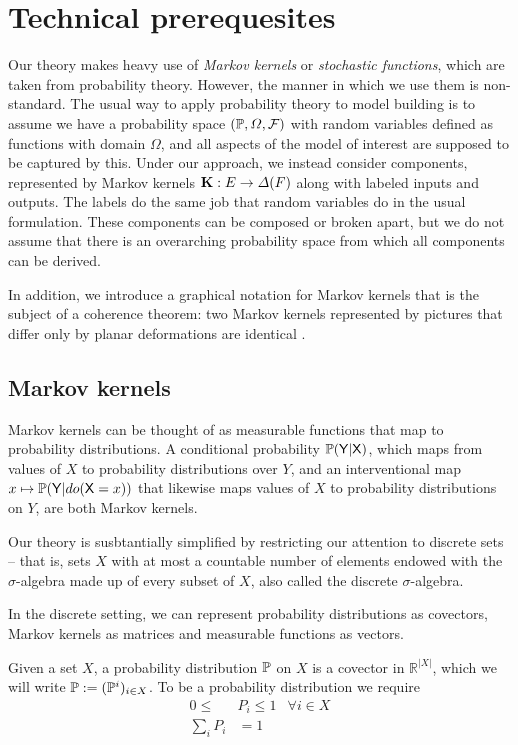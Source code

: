 

\section{Technical prerequesites}

Our theory makes heavy use of \emph{Markov kernels} or \emph{stochastic functions}, which are taken from probability theory. However, the manner in which we use them is non-standard. The usual way to apply probability theory to model building is to assume we have a probability space $(\mathbb{P},\Omega,\mathcal{F})$ with random variables defined as functions with domain $\Omega$, and all aspects of the model of interest are supposed to be captured by this. Under our approach, we instead consider components, represented by Markov kernels $\mathbf{K}:E\to \Delta(F)$ along with labeled inputs and outputs.  The labels do the same job that random variables do in the usual formulation. These components can be composed or broken apart, but we do not assume that there is an overarching probability space from which all components can be derived.

In addition, we introduce a graphical notation for Markov kernels that is the subject of a coherence theorem: two Markov kernels represented by pictures that differ only by planar deformations are identical \citep{selinger_survey_2010}.

\subsection{Markov kernels}
Markov kernels can be thought of as measurable functions that map to probability distributions. A conditional probability $\mathbb{P}(\mathsf{Y}|\mathsf{X})$, which maps from values of $X$ to probability distributions over $Y$, and an interventional map $x\mapsto \mathbb{P}(\mathsf{Y}|do(\mathsf{X}=x))$ that likewise maps values of $X$ to probability distributions on $Y$, are both Markov kernels.

Our theory is susbtantially simplified by restricting our attention to discrete sets -- that is, sets $X$ with at most a countable number of elements endowed with the $\sigma$-algebra made up of every subset of $X$, also called the discrete $\sigma$-algebra.

In the discrete setting, we can represent probability distributions as covectors, Markov kernels as matrices and measurable functions as vectors.

Given a set $X$, a probability distribution $\mathbb{P}$ on $X$ is a covector in $\mathbb{R}^{|X|}$, which we will write $\mathbb{P}:=(\mathbb{P}^i)_{i\in X}$. To be a probability distribution we require
\begin{align}
	0\leq &P_i \leq 1 &\forall i\in X\\
	\sum_i P_i &= 1 
\end{align}

